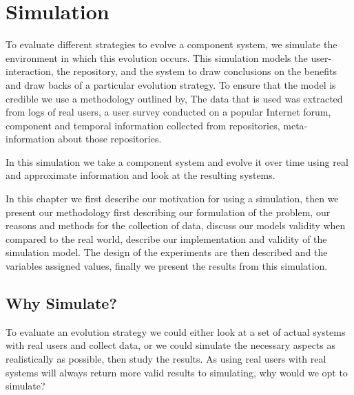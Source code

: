 \chapter{Simulation}
{}To evaluate different strategies to evolve a component system, we simulate the environment in which this evolution occurs.
{}This simulation models the user-interaction, the repository, and the system
{}to draw conclusions on the benefits and draw backs of a particular evolution strategy.
{}To ensure that the model is credible we use a methodology outlined by, %
{}The data that is used was extracted from logs of real users, a user survey conducted on a popular Internet forum, 
{}component and temporal information collected from repositories, meta-information about those repositories.

{}In this simulation we take a component system and evolve it over time using real and approximate information and look at the resulting systems.

{}In this chapter we first describe our motivation for using a simulation,
{}then we present our methodology
{}first describing our formulation of the problem,
{}our reasons and methods for the collection of data,
{}discuss our models validity when compared to the real world,
{}describe our implementation and validity of the simulation model.
{}The design of the experiments are then described and the variables assigned values,
{}finally we present the results from this simulation.
 
\section{Why Simulate?}
To evaluate an evolution strategy we could either look at a set of actual systems with real users and collect data,
or we could simulate the necessary aspects as realistically as possible, then study the results.
As using real users with real systems will always return more valid results to simulating,
why would we opt to simulate?

